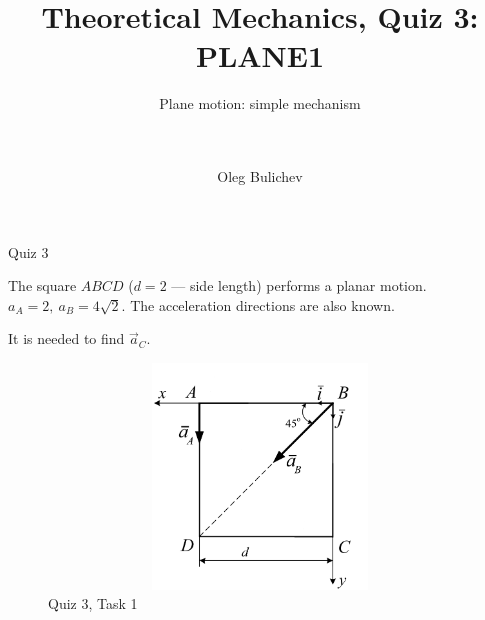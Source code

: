 \documentclass[aspectratio=169,xcolor=table,10pt, notes=hide]{beamer}
\title[Theoretical Mechanics]{Theoretical Mechanics, Quiz 3: PLANE1} %
\subtitle{Plane motion: simple mechanism \\ \  \\ \  } %
\author{Oleg Bulichev}
\newcommand{\fbckg}[1]{\usebackgroundtemplate{\texttt{[image: \#1]}}}%
\begin{document}
\setlength{\abovedisplayskip}{0pt}
\setlength{\belowdisplayskip}{0pt}
\setlength{\abovedisplayshortskip}{0pt}
\setlength{\belowdisplayshortskip}{0pt}

\fbckg{fibeamer/figs/title_page.png}

\note{}

\fbckg{fibeamer/figs/common.png}

\begin{frame}[t]{Quiz 3}
    \begin{minipage}{0.6\textwidth}
      The square $ABCD$ ($d=2$ --- side length) performs a planar motion. $a_A = 2,\ a_B = 4\sqrt{2}$. The acceleration directions are also known.
  
      It is needed to find $\vec{a}_C$.
    \end{minipage}
    \begin{minipage}{0.39\textwidth}
      \vspace{-0.5cm}
      \begin{figure}[H]
        \centering\includegraphics[height=6cm,width=1\textwidth,keepaspectratio]{quiz3_1.png}
        \caption*{Quiz 3, Task 1}
      \end{figure}
    \end{minipage}
  \end{frame}
\end{document}
